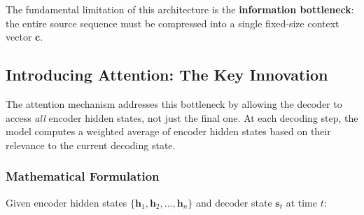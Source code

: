 The fundamental limitation of this architecture is the \textbf{information bottleneck}: the entire source sequence must be compressed into a single fixed-size context vector $\mathbf{c}$.

\subsection{Introducing Attention: The Key Innovation}

The attention mechanism addresses this bottleneck by allowing the decoder to access \textit{all} encoder hidden states, not just the final one. At each decoding step, the model computes a weighted average of encoder hidden states based on their relevance to the current decoding state.

\subsubsection{Mathematical Formulation}

Given encoder hidden states $\{\mathbf{h}_1, \mathbf{h}_2, ..., \mathbf{h}_n\}$ and decoder state $\mathbf{s}_t$ at time $t$:


